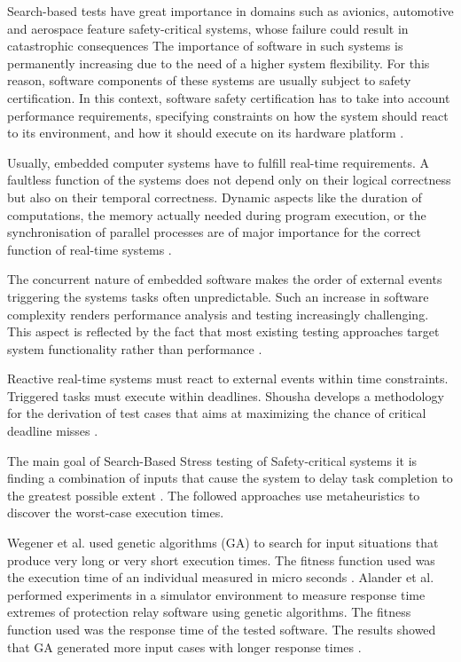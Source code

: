 \documentclass{bmcart}
\begin{document}
Search-based tests have great importance in domains such as avionics, automotive and aerospace feature safety-critical systems, whose failure could result in catastrophic consequences  The importance
of software in such systems is permanently increasing due to the need of a higher system
flexibility. For this reason, software components of these systems are usually subject to safety certification. In this context, software safety certification has to take into account performance requirements, specifying constraints on how the system should react to its environment, and how it should execute on its hardware platform \citep{DiAlesio2013}.

Usually, embedded computer systems have to fulfill real-time requirements. A faultless function of the systems does not depend only on their logical correctness but also on their temporal correctness. Dynamic aspects like the duration of computations, the memory actually needed during program execution, or the synchronisation of parallel processes are of major importance for the correct function of real-time systems  \citep{J.WegenerK.GrimmM.GrochtmannH.Sthamer1996} .

The concurrent nature of embedded software makes  the order of external events triggering the systems tasks often unpredictable. Such an increase in software complexity
renders performance analysis and testing increasingly
challenging. This aspect is reflected by the fact that most existing testing approaches target system functionality rather than performance \citep{DiAlesio2013}.

Reactive real-time systems must react to external events within time constraints. Triggered tasks must execute within deadlines. Shousha develops a methodology for the derivation of test cases that aims at maximizing the chance of critical deadline misses \citep{shousha2003performance}. 

The main goal of Search-Based Stress testing of Safety-critical systems it is finding a combination of inputs that cause the system to delay task completion to the greatest possible extent \citep{shousha2003performance}. The followed approaches use metaheuristics to discover the worst-case execution times. 

Wegener et al. \citep{Wegener1997} used genetic algorithms (GA) to search for input situations that produce very long or very short execution times. The fitness function used was the execution time of an individual measured in micro seconds \citep{Wegener1997}. Alander et al. \citep{Alander} performed experiments in a simulator environment to measure response time extremes of protection relay software using genetic algorithms. The fitness function used was the response time of the tested software. The results showed that GA generated more input cases with longer response times \citep{Alander}. 
\end{document}
